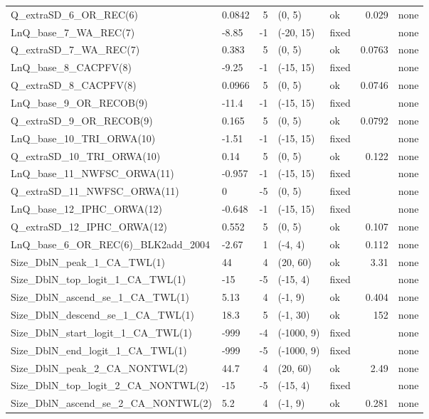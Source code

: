 \documentclass[
]{scrartcl}
\begin{document}
\begin{landscape}
\begin{longtable}{llrllrl}
Q\_extraSD\_6\_OR\_REC(6) & 0.0842 & 5 & (0, 5) & ok & 0.029 & none \\ 
LnQ\_base\_7\_WA\_REC(7) & -8.85 & -1 & (-20, 15) & fixed &  & none \\ 
Q\_extraSD\_7\_WA\_REC(7) & 0.383 & 5 & (0, 5) & ok & 0.0763 & none \\ 
LnQ\_base\_8\_CACPFV(8) & -9.25 & -1 & (-15, 15) & fixed &  & none \\ 
Q\_extraSD\_8\_CACPFV(8) & 0.0966 & 5 & (0, 5) & ok & 0.0746 & none \\ 
LnQ\_base\_9\_OR\_RECOB(9) & -11.4 & -1 & (-15, 15) & fixed &  & none \\ 
Q\_extraSD\_9\_OR\_RECOB(9) & 0.165 & 5 & (0, 5) & ok & 0.0792 & none \\ 
LnQ\_base\_10\_TRI\_ORWA(10) & -1.51 & -1 & (-15, 15) & fixed &  & none \\ 
Q\_extraSD\_10\_TRI\_ORWA(10) & 0.14 & 5 & (0, 5) & ok & 0.122 & none \\ 
LnQ\_base\_11\_NWFSC\_ORWA(11) & -0.957 & -1 & (-15, 15) & fixed &  & none \\ 
Q\_extraSD\_11\_NWFSC\_ORWA(11) & 0 & -5 & (0, 5) & fixed &  & none \\ 
LnQ\_base\_12\_IPHC\_ORWA(12) & -0.648 & -1 & (-15, 15) & fixed &  & none \\ 
Q\_extraSD\_12\_IPHC\_ORWA(12) & 0.552 & 5 & (0, 5) & ok & 0.107 & none \\ 
LnQ\_base\_6\_OR\_REC(6)\_BLK2add\_2004 & -2.67 & 1 & (-4, 4) & ok & 0.112 & none \\ 
Size\_DblN\_peak\_1\_CA\_TWL(1) & 44 & 4 & (20, 60) & ok & 3.31 & none \\ 
Size\_DblN\_top\_logit\_1\_CA\_TWL(1) & -15 & -5 & (-15, 4) & fixed &  & none \\ 
Size\_DblN\_ascend\_se\_1\_CA\_TWL(1) & 5.13 & 4 & (-1, 9) & ok & 0.404 & none \\ 
Size\_DblN\_descend\_se\_1\_CA\_TWL(1) & 18.3 & 5 & (-1, 30) & ok & 152 & none \\ 
Size\_DblN\_start\_logit\_1\_CA\_TWL(1) & -999 & -4 & (-1000, 9) & fixed &  & none \\ 
Size\_DblN\_end\_logit\_1\_CA\_TWL(1) & -999 & -5 & (-1000, 9) & fixed &  & none \\ 
Size\_DblN\_peak\_2\_CA\_NONTWL(2) & 44.7 & 4 & (20, 60) & ok & 2.49 & none \\ 
Size\_DblN\_top\_logit\_2\_CA\_NONTWL(2) & -15 & -5 & (-15, 4) & fixed &  & none \\ 
Size\_DblN\_ascend\_se\_2\_CA\_NONTWL(2) & 5.2 & 4 & (-1, 9) & ok & 0.281 & none \\ 

\end{longtable}
\end{landscape}
\end{document}
